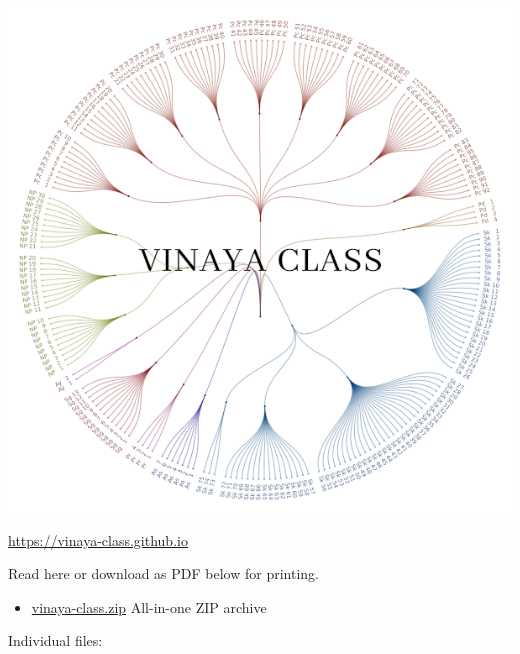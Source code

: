 \includegraphics{../../src/includes/figures/vinaya-class-title.w600.png}

\url{https://vinaya-class.github.io}

Read here or download as PDF below for printing.

\begin{itemize}
\tightlist
\item
  \href{./includes/docs/vinaya-class.zip}{vinaya-class.zip} All-in-one
  ZIP archive
\end{itemize}

Individual files:

